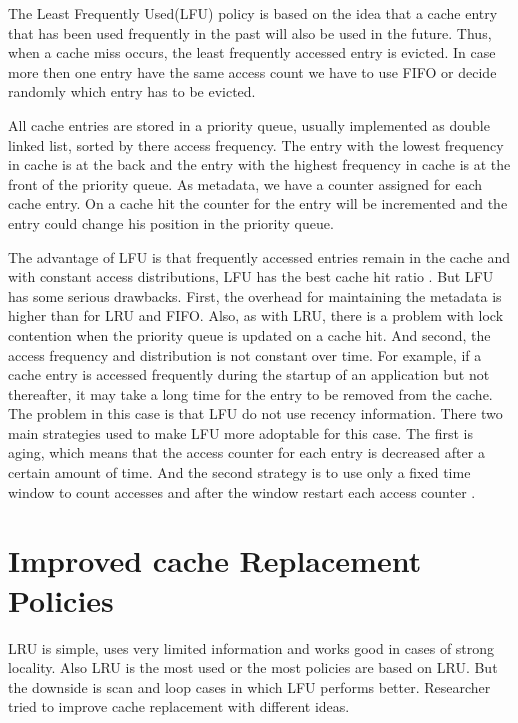 \documentclass[
	12pt,
	a4paper,
	abstract,
	bibliography=totoc,
	chapterprefix,
	headings=openright,
	numbers=endperiod,
	parskip=half,
	twoside,
]{scrreprt}
\begin{document}
The Least Frequently Used(LFU) policy is based on the idea that a cache entry that has been used frequently in the past will also be used in the future.
Thus, when a cache miss occurs, the least frequently accessed entry is evicted.
In case more then one entry have the same access count we have to use FIFO or decide randomly which entry has to be evicted.

All cache entries are stored in a priority queue, usually implemented as double linked list, sorted by there access frequency.
The entry with the lowest frequency in cache is at the back and the entry with the highest frequency in cache is at the front of the priority queue.
As metadata, we have a counter assigned for each cache entry.
On a cache hit the counter for the entry will be incremented and the entry could change his position in the priority queue.

The advantage of LFU is that frequently accessed entries remain in the cache and with constant
access distributions, LFU has the best cache hit ratio \cite{einziger2017tinylfu}.
But LFU has some  serious drawbacks.
First, the overhead for maintaining the metadata is higher than for LRU and FIFO.
Also, as with LRU, there is a problem with lock contention when the priority queue is updated on a cache hit.
And second, the access frequency and distribution is not constant over time.
For example, if a cache entry is accessed frequently during the startup of an application but not thereafter, it may take a long time for the entry to be removed from the cache.
The problem in this case is that LFU do not use recency information.
There two main strategies used to make LFU more adoptable for this case.
The first is aging, which means that the access counter for each entry is decreased after  a certain amount of time.
And the second strategy is to use only a fixed time window to count accesses and after the window restart each access counter \cite{karakostas2000practical}.

\section{Improved cache Replacement Policies}
LRU is simple, uses very limited information and works good in cases of strong locality.
Also LRU is the most used or the most policies are based on LRU.
But the downside is scan and loop cases in which LFU performs better.
Researcher tried to improve cache replacement with different ideas.
\end{document}
